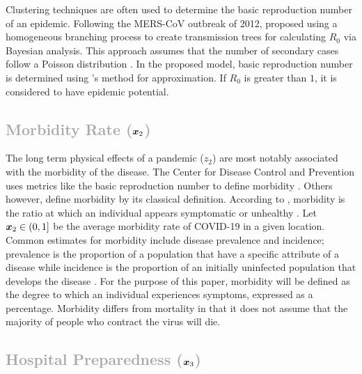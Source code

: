 \documentclass[12pt]{article}
\begin{document}
Clustering techniques are often used to determine the basic reproduction number of an epidemic. Following the MERS-CoV outbreak of 2012, \citeauthor{estimPandemic} proposed using a homogeneous branching process to create transmission trees for calculating $R_0$ via Bayesian analysis. This approach assumes that the number of secondary cases follow a Poisson distribution \citeyear{estimPandemic}. In the proposed model, basic reproduction number is determined using \citeauthor{estimPandemic}'s  method for approximation. If $R_0$ is greater than $1$, it is considered to have epidemic potential. 

\textcolor{darkgray}{\subsection{Morbidity Rate ($\boldsymbol{x}_2$)}}

The long term physical effects of a pandemic ($z_2$) are most notably associated with the morbidity of the disease. The Center for Disease Control and Prevention uses metrics like the basic reproduction number to define morbidity \cite{cdcMorbidity}. Others however, define morbidity by its classical definition. According to \citeauthor{Morbidity}, morbidity is the ratio at which an individual appears symptomatic or unhealthy \citeyear{Morbidity}. Let $\boldsymbol{x}_2 \in (0, 1]$ be the average morbidity rate of COVID-19 in a given location. Common estimates for morbidity include disease prevalence and incidence; prevalence is the proportion of a population that have a specific attribute of a disease while incidence is the proportion of an initially uninfected population that develops the disease \cite{cdcMorbidity}. For the purpose of this paper, morbidity will be defined as the degree to which an individual experiences symptoms, expressed as a percentage. Morbidity differs from mortality in that it does not assume that the majority of people who contract the virus will die.

\textcolor{darkgray}{\subsection{Hospital Preparedness ($\boldsymbol{x}_3$)}}


\end{document}
